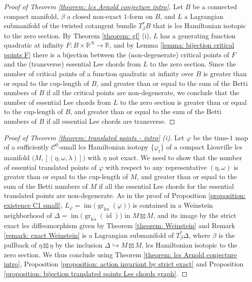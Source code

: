 \documentclass{amsart}
\DeclareMathOperator{\gr}{gr}
\DeclareMathOperator{\lcs}{lcs}
\DeclareMathOperator{\im}{im}
\DeclareMathOperator{\id}{id}
\theoremstyle{remark}
\begin{document}
\begin{proof}[Proof of Theorem \ref{theorem: lcs Arnold conjecture intro}]
Let $B$ be a connected compact manifold,
$\beta$ a closed non-exact $1$-form on $B$,
and $L$ a Lagrangian submanifold
of the twisted cotangent bundle $T^{\ast}_{\beta}B$
that is lcs Hamiltonian isotopic to the zero section.
By Theorem \ref{theorem: gf} (i),
$L$ has a generating function quadratic at infinity
$F: B \times \mathbb{R}^N \rightarrow \mathbb{R}$,
and by Lemma \ref{lemma: bijection critical points F}
there is a bijection between the (non-degenerate) critical points of $F$
and the (transverse) essential Lee chords
from $L$ to the zero section.
Since the number of critical points
of a function quadratic at infinity over $B$
is greater than or equal to the cup-length of $B$,
and greater than or equal to the sum of the Betti numbers of $B$
if all the critical points are non-degenerate,
we conclude that
the number of essential Lee chords
from $L$ to the zero section
is greater than or equal to the cup-length of $B$,
and greater than or equal to the sum of the Betti numbers of $B$
if all essential Lee chords are transverse.
\end{proof}

\begin{proof}[Proof of Theorem \ref{theorem: translated points - intro} (i)]
Let $\varphi$ be the time-$1$ map
of a sufficiently $\mathcal{C}^0$-small
lcs Hamiltonian isotopy $\{\varphi_t\}$
of a compact Liouville lcs manifold $\big( M , [(\eta, \omega, \lambda)]\big)$
with $\eta$ not exact.
We need to show that the number of essential translated points of $\varphi$
with respect to any representative $(\eta, \omega)$
is greater than or equal to the cup-length of $M$,
and greater than or equal to the sum of the Betti numbers of $M$
if all the essential Lee chords for the essential translated points
are non-degenerate.
As in the proof of Proposition \ref{proposition: existence C1 small},
$L_{\varphi} = \im \big(\gr_{\lcs} (\varphi) \big)$ is contained
in a Weinstein neighborhood of $\Delta = \im \big(\gr_{\lcs} (\id) \big)$
in $M \boxtimes M$,
and its image by the strict exact lcs diffeomorphism
given by Theorem \ref{theorem: Weinstein}
and Remark \ref{remark: exact Weinstein}
is a Lagrangian submanifold of $T_{\beta}^{\ast} \Delta$,
where $\beta$ is the pullback of $\eta \boxtimes \eta$
by the inclusion $\Delta \hookrightarrow M \boxtimes M$,
lcs Hamiltonian isotopic to the zero section.
We thus conclude using Theorem \ref{theorem: lcs Arnold conjecture intro},
Proposition \ref{proposition: action invariant by strict exact}
and Proposition \ref{proposition: bijection translated points Lee chords graph}.
\end{proof}
\end{document}
